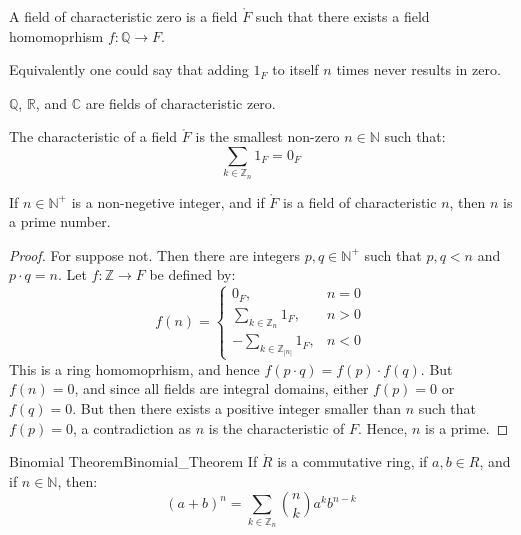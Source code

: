 \documentclass{article}                                                        %
\begin{document}
        \begin{definition}
            A field of characteristic zero is a field $\ring{F}$ such that there
            exists a field homomoprhism $f:\mathbb{Q}\rightarrow{F}$.
        \end{definition}
        Equivalently one could say that adding $1_{F}$ to itself $n$ times never
        results in zero.
        \begin{example}
            $\mathbb{Q}$, $\mathbb{R}$, and $\mathbb{C}$ are fields of
            characteristic zero.
        \end{example}
        \begin{definition}
            The characteristic of a field $\ring{F}$ is the smallest non-zero
            $n\in\mathbb{N}$ such that:
            \begin{equation}
                \sum_{k\in\mathbb{Z}_{n}}1_{F}=0_{F}
            \end{equation}
        \end{definition}
        \begin{theorem}
            If $n\in\mathbb{N}^{+}$ is a non-negetive integer, and if
            $\ring{F}$ is a field of characteristic $n$, then $n$ is a prime
            number.
        \end{theorem}
        \begin{proof}
            For suppose not. Then there are integers $p,q\in\mathbb{N}^{+}$ such
            that $p,q<n$ and $p\cdot{q}=n$. Let $f:\mathbb{Z}\rightarrow{F}$ be
            defined by:
            \begin{equation}
                f(n)=
                \begin{cases}
                    0_{F},&n=0\\
                    \sum_{k\in\mathbb{Z}_{n}}1_{F},&n>0\\
                    \minus\sum_{k\in\mathbb{Z}_{|n|}}1_{F},&n<0
                \end{cases}
            \end{equation}
            This is a ring homomoprhism, and hence
            $f(p\cdot{q})=f(p)\cdot{f}(q)$. But $f(n)=0$, and since all fields
            are integral domains, either $f(p)=0$ or $f(q)=0$. But then there
            exists a positive integer smaller than $n$ such that $f(p)=0$,
            a contradiction as $n$ is the characteristic of $F$. Hence, $n$ is
            a prime.
        \end{proof}
        \begin{ftheorem}{Binomial Theorem}{Binomial_Theorem}
            If $\ring{R}$ is a commutative ring, if $a,b\in{R}$, and if
            $n\in\mathbb{N}$, then:
            \begin{equation*}
                (a+b)^{n}=\sum_{k\in\mathbb{Z}_{n}}\binom{n}{k}a^{k}b^{n-k}
            \end{equation*}
        \end{ftheorem}
\end{document}
